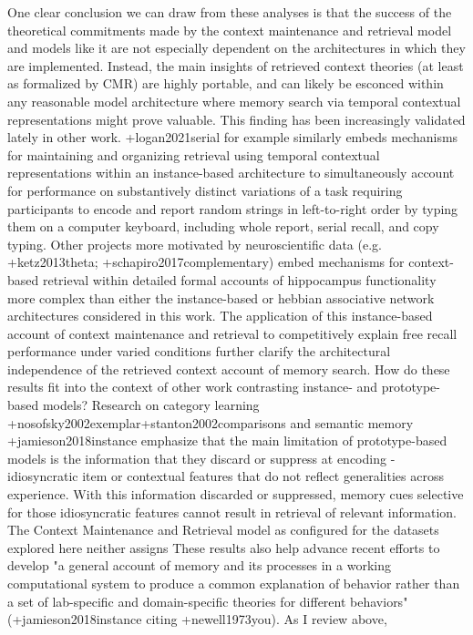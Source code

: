 One clear conclusion we can draw from these analyses is that the success of the theoretical commitments made by the context maintenance and retrieval model and models like it are not especially dependent on the architectures in which they are implemented. Instead, the main insights of retrieved context theories (at least as formalized by CMR) are highly portable, and can likely be esconced within any reasonable model architecture where memory search via temporal contextual representations might prove valuable. This finding has been increasingly validated lately in other work. +{}{}{logan2021serial} for example similarly embeds mechanisms for maintaining and organizing retrieval using temporal contextual representations within an instance-based architecture to simultaneously account for performance on substantively distinct variations of a task requiring participants to encode and report random strings in left-to-right order by typing them on a computer keyboard, including whole report, serial recall, and copy typing. Other projects more motivated by neuroscientific data (e.g. +{}{}{ketz2013theta}; +{}{}{schapiro2017complementary}) embed mechanisms for context-based retrieval within detailed formal accounts of hippocampus functionality more complex than either the instance-based or hebbian associative network architectures considered in this work. The application of this instance-based account of context maintenance and retrieval to competitively explain free recall performance under varied conditions further clarify the architectural independence of the retrieved context account of memory search.\markdownRendererInterblockSeparator
{}How do these results fit into the context of other work contrasting instance- and prototype-based models? Research on category learning +{}{}{nosofsky2002exemplar}+{}{}{stanton2002comparisons} and semantic memory +{}{}{jamieson2018instance} emphasize that the main limitation of prototype-based models is the information that they discard or suppress at encoding - idiosyncratic item or contextual features that do not reflect generalities across experience. With this information discarded or suppressed, memory cues selective for those idiosyncratic features cannot result in retrieval of relevant information. The Context Maintenance and Retrieval model as configured for the datasets explored here neither assigns\markdownRendererInterblockSeparator
{}These results also help advance recent efforts to develop "a general account of memory and its processes in a working computational system to produce a common explanation of behavior rather than a set of lab-specific and domain-specific theories for different behaviors" (+{}{}{jamieson2018instance} citing +{}{}{newell1973you}). As I review above,\relax